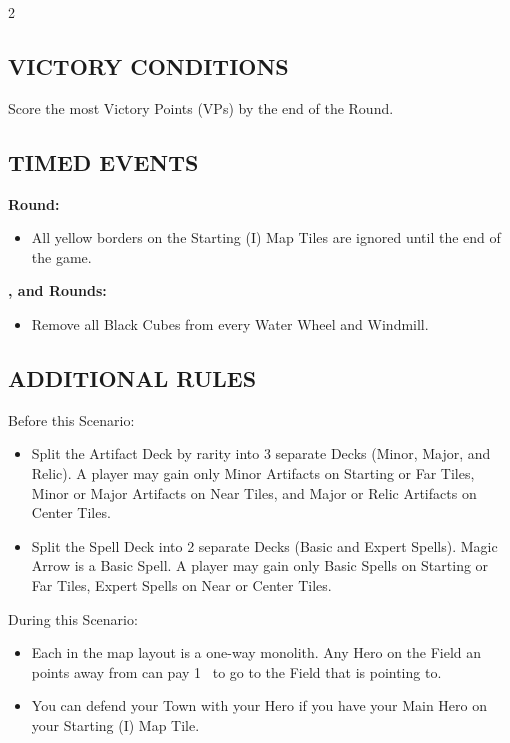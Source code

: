 \begin{multicols}{2}
\subsection*{\MakeUppercase{Victory Conditions}}
Score the most Victory Points (VPs) by the end of the  Round.

\subsection*{\MakeUppercase{Timed Events}}

\textbf{ Round:}
\begin{itemize}
  \item All yellow borders on the Starting (I) Map Tiles are ignored until the end of the game.
\end{itemize}
\textbf{,  and  Rounds:}
\begin{itemize}
  \item Remove all Black Cubes from every Water Wheel and Windmill.
\end{itemize}

\subsection*{\MakeUppercase{Additional Rules}}
Before this Scenario:

\begin{itemize}
  \item Split the Artifact Deck by rarity into 3 separate Decks (Minor, Major, and Relic).
    A player may gain only Minor Artifacts on Starting or Far Tiles, Minor or Major Artifacts on Near Tiles, and Major or Relic Artifacts on Center Tiles.
  \item Split the Spell Deck into 2 separate Decks (Basic and Expert Spells). Magic Arrow is a Basic Spell.
    A player may gain only Basic Spells on Starting or Far Tiles, Expert Spells on Near or Center Tiles.
\end{itemize}

During this Scenario:

\begin{itemize}
  \item Each  in the map layout is a one-way monolith.
    Any Hero on the Field an  points away from can pay 1~ to go to the Field that  is pointing to.
  \item You can defend your Town with your Hero if you have your Main Hero on your Starting (I) Map Tile.
\end{itemize}


\end{multicols}
